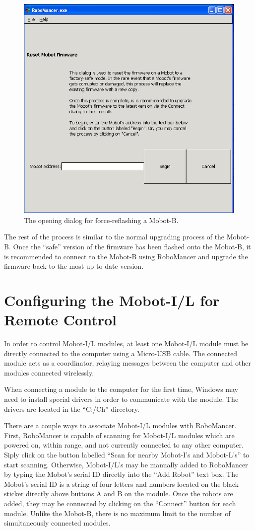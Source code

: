 \documentclass{article}
\begin{document}
\begin{figure}[H]
\begin{center}
\includegraphics[width=4.5in]{images/reset1.png}
\end{center}
\caption{\label{fig:reset1} The opening dialog for force-reflashing a Mobot-B.}
\end{figure}

The rest of the process is similar to the normal upgrading process of the Mobot-B. Once
the ``safe'' version of the firmware has been flashed onto the Mobot-B, it is recommended to
connect to the Mobot-B using RoboMancer and upgrade the firmware back to the most up-to-date
version.

\section{Configuring the Mobot-I/L for Remote Control}
In order to control Mobot-I/L modules, at least one Mobot-I/L module must be directly 
connected to the computer using a Micro-USB cable. The connected module acts as a 
coordinator, relaying messages between the computer and other modules connected wirelessly.

When connecting a module to the computer for the first time, Windows may need to install
special drivers in order to communicate with the module. The drivers are located in the
``C:/Ch'' directory.

There are a couple ways to associate Mobot-I/L modules with RoboMancer. First, RoboMancer
is capable of scanning for Mobot-I/L modules which are powered on, within range, and
not currently connected to any other computer. Siply click on the button 
labelled ``Scan for nearby Mobot-I's and Mobot-L's'' to start scanning. Otherwise,
Mobot-I/L's may be manually added to RoboMancer by typing the Mobot's serial ID
directly into the ``Add Robot'' text box. The Mobot's serial ID is a string of 
four letters and numbers located on the black sticker directly above buttons A and B
on the module. Once the robots are added, they may be connected by clicking on the 
``Connect'' button for each module. Unlike the Mobot-B, there is no maximum limit
to the number of simultaneously connected modules.
\end{document}
